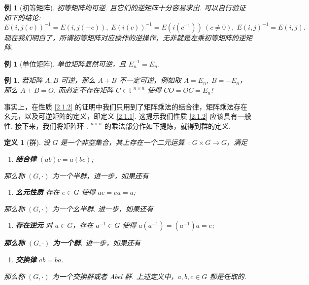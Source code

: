 \documentclass[10pt,openany]{article}
\theoremstyle{thmstyle} %
\theoremstyle{defstyle} %
\newtheorem{definition}[theorem]{定义}
\theoremstyle{prostyle} %
\theoremstyle{exastyle}
\newtheorem{example}[theorem]{例}
\theoremstyle{remstyle}
\newcommand{\F}{\mathbb{F}}
\newcommand{\n}{^{n \times n}}
\begin{document}
\begin{example}[初等矩阵]	\label{2.1.3}
	初等矩阵均可逆. 且它们的逆矩阵十分容易求出. 可以自行验证如下的结论:
	\[ E(i,j(c))^{-1}=E(i,j(-c)), \; E(i(c))^{-1}=E(i(c^{-1})) \ (c \neq 0), \; E(i,j)^{-1}=E(i,j). \]
	现在我们明白了，所谓初等矩阵对应操作的逆操作，无非就是左乘初等矩阵的逆矩阵.

\end{example}

\begin{example}[单位矩阵]
	单位矩阵显然可逆，且 \( E_n^{-1}=E_n \).
\end{example}

\begin{example}\label{2.1.5}
	若矩阵 \( A,B \) 可逆，那么 \( A+B \) 不一定可逆，例如取 \( A=E_n, \; B=-E_n \)，那么 \( A+B=O \). 而必定不存在矩阵 \( C \in \F\n \) 使得 \( CO=OC=E_n \)!
	
\end{example}

事实上，在性质 \ref{2.1.2} 的证明中我们只用到了矩阵乘法的结合律，矩阵乘法存在幺元，以及可逆矩阵的定义，即定义 \ref{2.1.1}. 这提示我们性质 \ref{2.1.2} 应该具有一般性. 接下来，我们将矩阵环 \( \F\n \) 的乘法部分作如下提炼，就得到群的定义.

\begin{definition}[群]
	设 \( G \) 是一个非空集合，其上存在一个二元运算 \( \cdot: G \times G \to G \)，满足
	\begin{enumerate}
		\item[(1)] \textbf{结合律} \( (ab)c=a(bc) \);
	\end{enumerate}
	那么称 \( (G,\cdot) \) 为一个半群，进一步，如果还有
	\begin{enumerate}
		\item[(2)] \textbf{幺元性质} 存在 \( e \in G \) 使得 \( ae=ea=a \);
	\end{enumerate}
	那么称 \( (G,\cdot) \) 为一个幺半群. 进一步，如果还有
	\begin{enumerate}
		\item[(3)] \textbf{存在逆元} 对 \( a \in G \)，存在 \( a^{-1} \in G \) 使得 \( a(a^{-1})=(a^{-1})a=e \);
	\end{enumerate}
	\textbf{那么称 \( (G,\cdot) \) 为一个群. } 进一步，如果还有
	\begin{enumerate}
		\item[(4)] \textbf{交换律} \( ab=ba \).
	\end{enumerate}
	那么称 \( (G,\cdot) \) 为一个交换群或者 Abel 群. 上述定义中，\( a,b,c \in G \) 都是任取的.
\end{definition}
\end{document}
